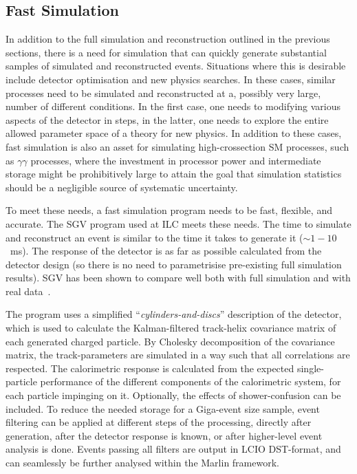 \subsection{\label{sub:sw-fastsim}Fast Simulation}

In addition to the full simulation and reconstruction 
outlined in the previous sections,
there is a need for simulation that can quickly generate
substantial samples of simulated and reconstructed events.
Situations where this is desirable include detector optimisation
and new physics searches. In these cases,
similar processes need to be simulated and reconstructed at
a, possibly very large, number of different conditions.
In the first case, one needs to  modifying various aspects
of the detector in steps, in the latter,
one needs to  explore the entire allowed parameter space
of a theory for new physics.
In addition to these cases,
fast simulation is also an asset for simulating high-crossection
SM processes, such as $\gamma\gamma$ processes, where the investment 
in processor power and intermediate storage might be
prohibitively large to attain the goal that simulation statistics
should be a negligible source of systematic uncertainty.

To meet these needs,
a fast simulation program needs to be fast, flexible, and
accurate. 
The SGV program\cite{Berggren:2012ar} used at ILC meets these needs.
The time to simulate and reconstruct an event is similar to
the time it takes to generate it ($\sim 1-10$~ms).
The response of the detector is as far as possible calculated
from the detector design (so there is no need to parametrisise
pre-existing full simulation results).  SGV
has been shown to compare well  both with full simulation
and with  real data~\cite{Abdallah:2003xe}.

The program uses a simplified ``{\it cylinders-and-discs}'' description
of the detector,
which is used to calculate the Kalman-filtered track-helix covariance matrix
of each generated charged particle.
By Cholesky decomposition of the covariance matrix,
the track-parameters are simulated in a way such that all correlations
are respected.
The calorimetric response is calculated from the expected single-particle
performance of the different components of the calorimetric system,
for each particle impinging on it. Optionally,
the effects of shower-confusion can be included.
To reduce the needed storage for a Giga-event size sample,
event filtering can be applied at different steps of the processing,
directly after generation, after the detector response is known,
or after higher-level event analysis is done.
Events passing all filters are output in LCIO DST-format,
and can seamlessly be further analysed within the Marlin framework.


